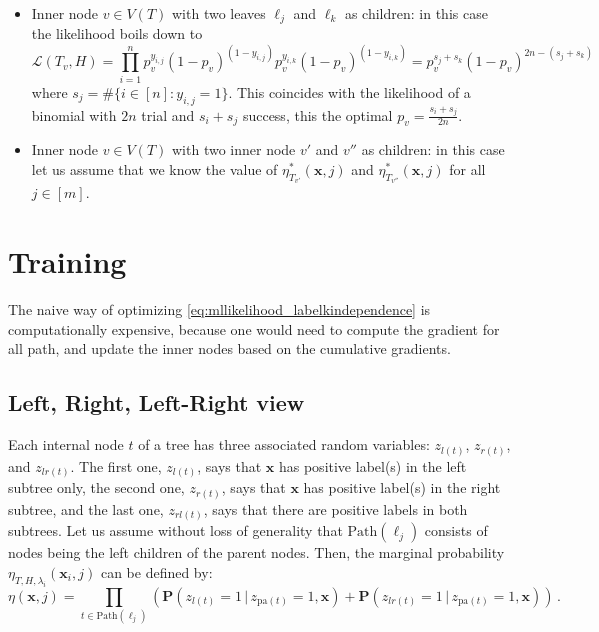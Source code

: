 \documentclass{article}
\newcommand{\cL}{\mathcal{L}}
\newcommand{\Path}[1]{\mathrm{Path}(#1)}
\newcommand{\pa}[1]{\mathrm{pa}(#1)}
\newcommand{\bx}{\mathbf{x}}
\newcommand{\prob}{\mathbf{P}}
\newcommand{\given}{\, | \,}
\begin{document}
\begin{itemize}
    \item Inner node $v\in V(T)$ with two leaves $\ell_j$ and $\ell_k$ as children: in this case the likelihood boils down to
    \[
    \cL ( T_v, H ) = \prod_{i=1}^{n} p_v^{y_{i,j}} (1-p_v)^{(1-y_{i,j})}p_v^{y_{i,k}} (1-p_v)^{(1-y_{i,k})} = p_v^{s_j+s_k} (1-p_v)^{2n-(s_j+s_k)}
    \]
    where $s_j = \# \{ i \in [n] : y_{i,j}=1\}$. This coincides with the likelihood of a binomial with $2n$ trial and $s_i+s_j$ success, this the optimal $p_v=\tfrac{s_i+s_j}{2n}$.
    \item Inner node $v\in V(T)$ with two inner node $v'$ and $v''$ as children: in this case let us assume that we know the value of $\eta_{T_{v'}}^* (\bx , j)$ and $\eta_{T_{v''}}^* (\bx , j)$ for all $j\in [m]$.
\end{itemize}







\section{Training}

The naive way of optimizing \ref{eq:mllikelihood_labelkindependence} is computationally expensive, because one would need to compute the gradient for all path, and update the inner nodes based on the cumulative gradients. 

\subsection{Left, Right, Left-Right view}

Each internal node $t$ of a tree has three associated random variables: $z_{l(t)}$, $z_{r(t)}$, and $z_{lr(t)}$. The first one, $z_{l(t)}$, says that $\bx$ has positive label(s) in the left subtree only, the second one, $z_{r(t)}$, says that $\bx$ has positive label(s) in the right subtree, and the last one, $z_{rl(t)}$, says that there are positive labels in both subtrees. Let us assume without loss of generality that $\Path{\ell_j}$ consists of nodes being the left children of the parent nodes. Then, the marginal probability $\eta_{T,H,\lambda_i} ( \bx_i , j )$ can be defined by:
\begin{equation}
\eta(\bx, j) = \prod_{t \in \Path{\ell_j}}  \left ( \prob(z_{l(t)} = 1 \given z_{\pa{t}} =1, \bx) + \prob(z_{lr(t)} = 1 \given z_{\pa{t}} =1, \bx) \right ) \,.
\label{eqn:probabilistic_tree}
\end{equation}
\end{document}

